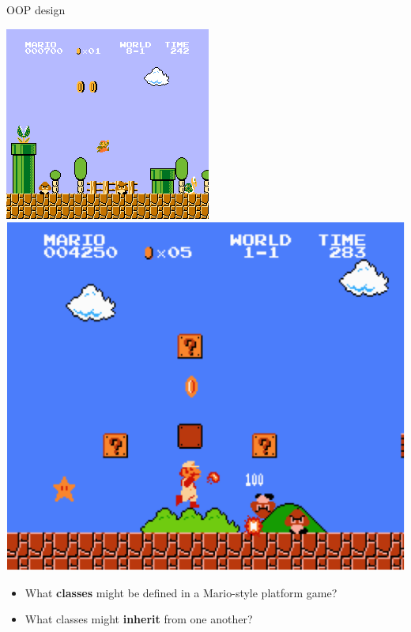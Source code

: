 \begin{frame}{OOP design}
	\begin{center}
		\includegraphics[height=0.4\textheight]{mario}
		\hspace{0.1\textwidth}
		\includegraphics[height=0.4\textheight]{mario2}
	\end{center}
	\begin{itemize}
		\item What \textbf{classes} might be defined in a Mario-style platform game?
		\item What classes might \textbf{inherit} from one another?
	\end{itemize}
\end{frame}
